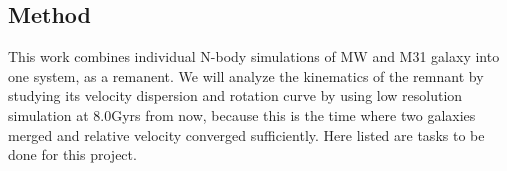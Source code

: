\documentclass[twocolumn, trackchanges]{aastex7}
\begin{document}
\subsection{Method}
This work combines individual N-body simulations of MW and M31 galaxy into one system, as a remanent. We will analyze the kinematics of the remnant by studying its velocity dispersion and rotation curve by using low resolution simulation at 8.0Gyrs from now, because this is the time where two galaxies merged and relative velocity converged sufficiently. Here listed are tasks to be done for this project. 
\end{document}
